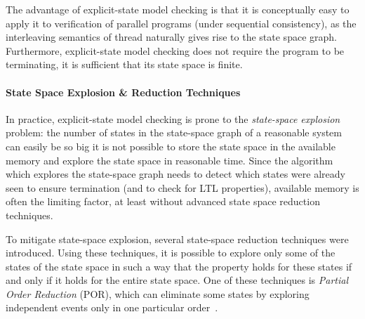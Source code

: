The advantage of explicit-state model checking is that it is conceptually easy
to apply it to verification of parallel programs (under sequential
consistency), as the interleaving semantics of thread naturally gives rise to
the state space graph.
Furthermore, explicit-state model checking does not require the program to be terminating, it is sufficient that its state space is finite.

\paragraph{State Space Explosion \& Reduction Techniques}

In practice, explicit-state model checking is prone to the \emph{state-space
explosion} problem: the number of states in the state-space graph of a
reasonable system can easily be so big it is not possible to store the state
space in the available memory and explore the state space in reasonable time.
Since the algorithm which explores the state-space graph needs to detect which
states were already seen to ensure termination (and to check for LTL
properties), available memory is often the limiting factor, at least without
advanced state space reduction techniques.

To mitigate state-space explosion, several state-space reduction techniques
were introduced.
Using these techniques, it is possible to explore only some of the states of
the state space in such a way that the property holds for these states if and
only if it holds for the entire state space.
One of these techniques is \emph{Partial Order Reduction} (POR), which
can eliminate some states by exploring independent events only in one
particular order~.


